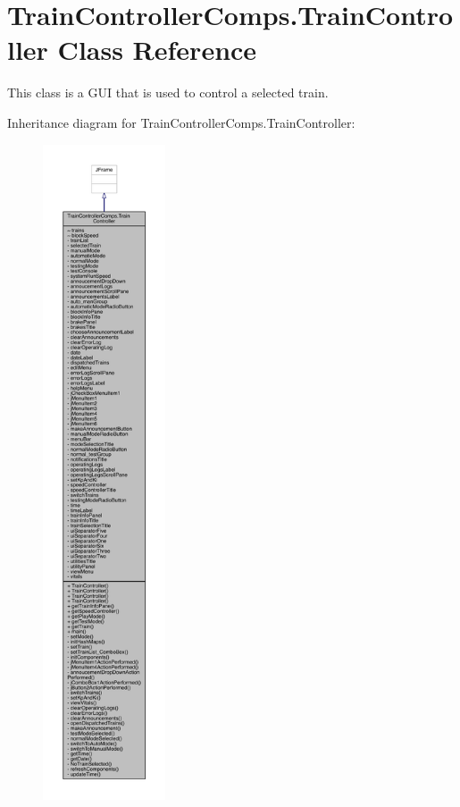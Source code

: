 \hypertarget{classTrainControllerComps_1_1TrainController}{}\section{Train\+Controller\+Comps.\+Train\+Controller Class Reference}
\label{classTrainControllerComps_1_1TrainController}


This class is a G\+UI that is used to control a selected train.  




Inheritance diagram for Train\+Controller\+Comps.\+Train\+Controller\+:
\nopagebreak
\begin{figure}[H]
\begin{center}
\leavevmode
\includegraphics[height=550pt]{classTrainControllerComps_1_1TrainController__inherit__graph}
\end{center}
\end{figure}


